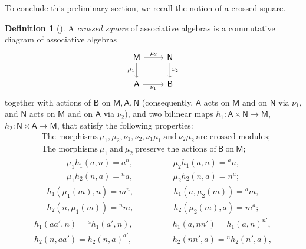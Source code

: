 \documentclass[12pt,reqno]{amsart}
\theoremstyle{plain}
\theoremstyle{definition}
\newtheorem{definition}[theorem]{Definition}
\theoremstyle{remark}
\newcommand{\A}{\ensuremath{\mathsf{A}}}
\newcommand{\B}{\ensuremath{\mathsf{B}}}
\newcommand{\MM}{\ensuremath{\mathsf{M}}}
\newcommand{\NN}{\ensuremath{\mathsf{N}}}
\numberwithin{equation}{section}
\begin{document}
To conclude this preliminary section, we recall the notion of a crossed square.
\begin{definition}[\cite{El}]\label{square} A \emph{crossed square} of associative algebras is a commutative diagram of associative algebras
	\[	
	\begin{tikzcd}
		\MM \arrow[d,"\mu_1",swap] \arrow[r, "\mu_2"]  & \NN \arrow[d,"\nu_2"] \\
		\A \arrow[r,"\nu_1",swap]                     & \B           
	\end{tikzcd} 
	\]
together with actions of  $\B$ on $\MM, \A, \NN$ (consequently, $\A$ acts on $\MM$ and on $\NN$ via $\nu_1$, and  $\NN$ acts on $\MM$ and on $\A$ via $\nu_2$), and
 two bilinear maps $h_1 \colon \A \times \NN \to \MM$, $h_2 \colon \NN  \times \A \to \MM$, that satisfy the following properties:
 \begin{equation}\tag{SC1}  \label{SC1}
\begin{aligned}
&	\text{The morphisms} \  \mu_1,\mu_2,\nu_1,\nu_2, \nu_1\mu_1  \ \text{and} \  \nu_2\mu_2 \ \text{are crossed modules};\\
&	\text{The morphisms} \ \mu_1 \  \text{and} \  \mu_2 \ \text{preserve the actions of} \ \B \ \text{on} \ \MM; 
\end{aligned}
\end{equation}
\begin{equation}\tag{SC2} \label{SC2}
	\begin{aligned}
		\mu_1 h_1(a,n)= a^n,& \qquad \qquad  \mu_2 h_1(a,n)=  {} ^a{}n , \\
		\mu_1 h_2(n,a)=   {}^n{}a,&  \qquad \qquad \mu_2 h_2(n,a)= {} n^a;
	\end{aligned}
\end{equation}
\begin{equation}\tag{SC3} \label{SC3}
	\begin{aligned}
		 h_1(\mu_1(m),n)= m^n,&   \qquad \qquad  h_1(a,\mu_2(m))= {}^a{}m,\\
	 h_2(n,\mu_1(m))= {}^n{}m,&  \qquad \qquad h_2(\mu_2(m),a)= m^a;
	\end{aligned}
\end{equation}
\begin{equation}\tag{SC4} \label{SC4}
	\begin{aligned}
	 h_1(a a',n)=   {}^a{}h_1(a',n),&   \qquad  \qquad  h_1(a,nn')= h_1(a,n)^{n'},  \\
  h_2(n,a a')= h_2(n,a)^{a'} ,& \qquad   \qquad 	 h_2(nn',a)=  {}^n{}h_2(n',a),\\

\end{aligned}
\end{equation}
\end{definition}
\end{document}
